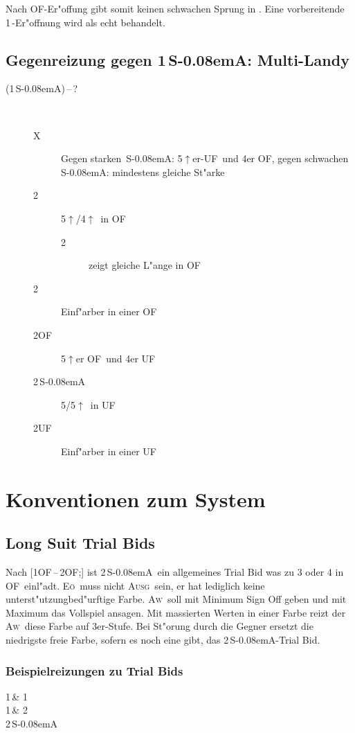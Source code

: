 \documentclass[11pt,german,twocolumn]{scrartcl}
\renewcommand{\Cl}{{\color{ClColor}{\clubs}}}
\renewcommand{\Di}{{\color{DiColor}{\sdiamonds}}}
\renewcommand{\He}{{\color{HeColor}{\shearts}}}
\renewcommand{\Sp}{{\color{SpColor}{\spades}}}
\def\pik{\,\Sp}
\def\coe{\,\He}
\def\kar{\,\Di}
\def\tre{\,\Cl}
\def\tr{\Cl}
\def\pl{$\uparrow$}
\def\ufa{\textsf{UF}}
\def\ofa{\textsf{OF}}
\def\sa{\textsf{S\kern-0.08emA}}
\def\SA{\,\sa}
\def\kontra{\textsf{X}}
\def\sep{\,--\,}
\def\bal{\textsc{Ausg}}
\def\aw{\textsc{Aw}}
\def\eo{\textsc{E\"o}}
\def\bdsc{\begin{description}}
\def\edsc{\end{description}}
\begin{document}
Nach \ofa-Er"offung gibt somit keinen schwachen Sprung in \tr. Eine
vorbereitende 1\tre-Er"offnung wird als echt behandelt.

\subsection{Gegenreizung gegen 1\SA: Multi-Landy}

\bdsc
\item[(1\SA)\sep?] ~
 \bdsc
 \item[\kontra] Gegen starken \SA: 5\pl{}er-\ufa\ und 4er \ofa,
  gegen schwachen \SA: mindestens gleiche St"arke
 \item[2\tre] 5\pl/4\pl\ in \ofa
  \bdsc
  \item[2\kar] zeigt gleiche L"ange in \ofa
  \edsc
 \item[2\kar] Einf"arber in einer \ofa
 \item[2\ofa] 5\pl{}er \ofa\ und 4er \ufa
 \item[2\SA] 5/5\pl\ in \ufa
 \item[2\ufa] Einf"arber in einer \ufa
 \edsc
\edsc

\section{Konventionen zum System}

\subsection{Long Suit Trial Bids}

Nach [1\ofa\sep2\ofa;] ist 2\SA\ ein allgemeines Trial Bid was zu 3 oder 4 in
\ofa\ einl"adt. \eo\ muss nicht \bal\ sein, er hat lediglich keine
unterst"utzungbed"urftige Farbe. \aw\ soll mit Minimum Sign Off geben und mit
Maximum das Vollspiel ansagen. Mit massierten Werten in einer Farbe reizt der
\aw\ diese Farbe auf 3er-Stufe. Bei St"orung durch die Gegner ersetzt die
niedrigste freie Farbe, sofern es noch eine gibt, das 2\SA-Trial Bid.

\subsubsection{Beispielreizungen zu Trial Bids}

{
  1\tre & 1\coe \\
  1\pik & 2\pik \\
  2\SA{}
}
{
}
\end{document}
